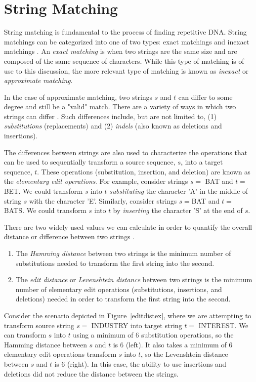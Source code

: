 \section{String Matching}
String matching is fundamental to the process of finding repetitive DNA. String matchings can be categorized into one of two types: exact matchings and inexact matchings \cite{gusfield1997algorithms}. An \textit{exact matching} is when two strings are the same size and are composed of the same sequence of characters. While this type of matching is of use to this discussion, the more relevant type of matching is known as \textit{inexact} or \textit{approximate matching}. 

In the case of approximate matching, two strings $s$ and $t$ can differ to some degree and still be a "valid" match. There are a variety of ways in which two strings can differ \cite{kruskal1983an-overview}. Such differences include, but are not limited to, (1) \textit{substitutions} (replacements) and (2) \textit{indels} (also known as deletions and insertions). 

The differences between strings are also used to characterize the operations that can be used to sequentially transform a source sequence, $s$, into a target sequence, $t$. These operations (substitution, insertion, and deletion) are known as the \textit{elementary edit operations}. For example, consider strings $s=$ BAT and $t=$ BET. We could transform $s$ into $t$ \textit{substituting} the character 'A' in the middle of string $s$ with the character 'E'. Similarly, consider strings $s=$BAT and $t=$BATS. We could transform $s$ into $t$ by \textit{inserting} the character 'S' at the end of $s$.

 There are two widely used values we can calculate in order to quantify the overall distance or difference between two strings \cite{kruskal1983an-overview}. 
 \begin{enumerate}
 \item{The \textit{Hamming distance} between two strings is the minimum number of substitutions needed to transform the first string into the second.}
 \item{The \textit{edit distance} or \textit{Levenshtein distance} \cite{levenshtein1966binary} between two strings is the minimum number of elementary edit operations (substitutions, insertions, and deletions) needed in order to transform the first string into the second.}
 \end{enumerate}
Consider the scenario depicted in Figure~\ref{editdistex}, where we are attempting to transform source string $s=$ INDUSTRY into target string $t=$ INTEREST. We can transform $s$ into $t$ using a minimum of 6 substitution operations, so the Hamming distance between $s$ and $t$ is 6 (left). It also takes a minimum of 6 elementary edit operations  transform $s$ into $t$, so the Levenshtein distance between $s$ and $t$ is 6 (right). In this case, the ability to use insertions and deletions did not reduce the distance between the strings.

